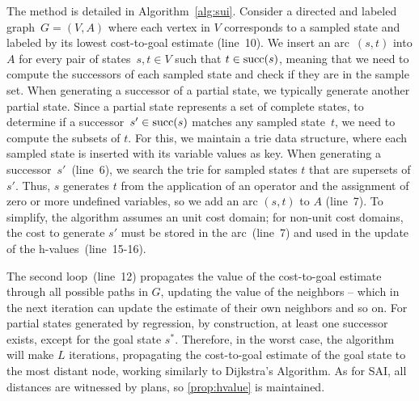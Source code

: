 The method is detailed in Algorithm~\ref{alg:sui}. Consider a directed and labeled graph~$G=(V,A)$ where each vertex in $V$ corresponds to a sampled state and labeled by its lowest cost-to-goal estimate (line~10). We insert an arc~$(s,t)$ into $A$ for every pair of states~$s,t \in V$ such that $t \in \operatorname{succ}(s)$, meaning that we need to compute the successors of each sampled state and check if they are in the sample set. When generating a successor of a partial state, we typically generate another partial state. Since a partial state represents a set of complete states, to determine if a successor~$s' \in \operatorname{succ}(s)$ matches any sampled state~$t$, we need to compute the subsets of $t$. For this, we maintain a trie data structure, where each sampled state is inserted with its variable values as key. When generating a successor~$s'$~(line~6), we search the trie for sampled states $t$ that are supersets of $s'$. Thus, $s$ generates $t$ from the application of an operator and the assignment of zero or more undefined variables, so we add an arc $(s,t)$ to $A$ (line~7). To simplify, the algorithm assumes an unit cost domain; for non-unit cost domains, the cost to generate $s'$ must be stored in the arc~(line~7) and used in the update of the h-values~(line~15-16).

The second loop~(line~12) propagates the value of the cost-to-goal estimate through all possible paths in $G$, updating the value of the neighbors -- which in the next iteration can update the estimate of their own neighbors and so on. For partial states generated by regression, by construction, at least one successor exists, except for the goal state $s^*$. Therefore, in the worst case, the algorithm will make $L$ iterations, propagating the cost-to-goal estimate of the goal state to the most distant node, working similarly to Dijkstra's Algorithm. As for SAI, all distances are witnessed by plans, so \cref{prop:hvalue} is maintained.

